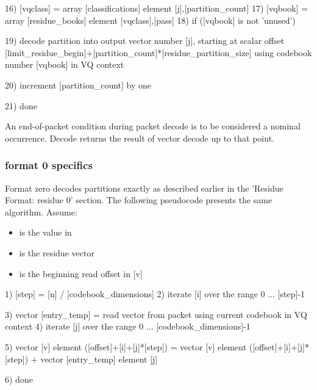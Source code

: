 \begin{programlisting}
{{{{                           16) [vqclass] = array [classifications] element [j],[partition\_count]
                           17) [vqbook] = array [residue\_books] element [vqclass],[pass]
                           18) if ([vqbook] is not 'unused') {

                                19) decode partition into output vector number [j], starting at scalar
                                    offset [limit\_residue\_begin]+[partition\_count]*[residue\_partition\_size] using
                                    codebook number [vqbook] in VQ context
                          }
                     }

                 20) increment [partition\_count] by one

               }
          }
     }

 21) done

\end{programlisting}

An end-of-packet condition during packet decode is to be considered a
nominal occurrence.  Decode returns the result of vector decode up to
that point.



\subsubsection{format 0 specifics}

Format zero decodes partitions exactly as described earlier in the
'Residue Format: residue 0' section.  The following pseudocode
presents the same algorithm. Assume:

\begin{itemize}
\item  \varname{[n]} is the value in 
\item \varname{[v]} is the residue vector
\item \varname{[offset]} is the beginning read offset in [v]
\end{itemize}


\begin{programlisting}
 1) [step] = [n] / [codebook\_dimensions]
 2) iterate [i] over the range 0 ... [step]-1 {

      3) vector [entry\_temp] = read vector from packet using current codebook in VQ context
      4) iterate [j] over the range 0 ... [codebook\_dimensions]-1 {

           5) vector [v] element ([offset]+[i]+[j]*[step]) =
	        vector [v] element ([offset]+[i]+[j]*[step]) +
                vector [entry\_temp] element [j]

         }

    }

  6) done

\end{programlisting}



